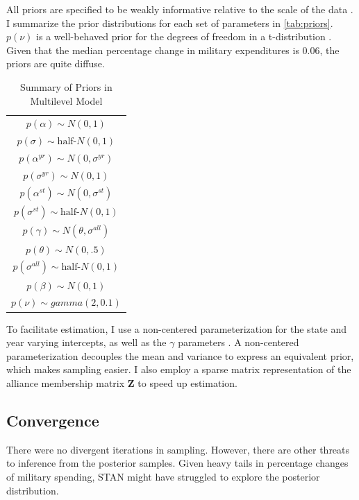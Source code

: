 \documentclass[12pt]{article}
\begin{document}
All priors are specified to be weakly informative relative to the scale of the data \citep{Gelmanetal2017}. 
I summarize the prior distributions for each set of parameters in \autoref{tab:priors}. 
$p(\nu)$ is a well-behaved prior for the degrees of freedom in a t-distribution \citep{JuarezSteele2010}. 
Given that the median percentage change in military expenditures is 0.06, the priors are quite diffuse. 


\begin{table} %
\begin{center}
\begin{tabular}{c} 
$ p(\alpha) \sim N(0, 1)$  \\
$ p(\sigma) \sim \mbox{half-}N(0, 1) $ \\
$ p(\alpha^{yr}) \sim N(0, \sigma^{yr}) $ \\ 
$ p(\sigma^{yr}) \sim N(0, 1) $ \\
$ p(\alpha^{st}) \sim N(0, \sigma^{st}) $ \\ 
$ p(\sigma^{st}) \sim \mbox{half-}N(0, 1) $ \\ 
$ p(\gamma) \sim N(\theta, \sigma^{all}) $ \\ 
$ p(\theta) \sim N(0, .5) $ \\
$ p(\sigma^{all}) \sim \mbox{half-}N(0, 1) $ \\
$ p(\beta) \sim N(0, 1) $ \\
$ p(\nu) \sim gamma(2, 0.1)$ 
\end{tabular} 
\caption{Summary of Priors in Multilevel Model} 
\label{tab:priors}
\end{center} 
\end{table} 


To facilitate estimation, I use a non-centered parameterization for the state and year varying intercepts, as well as the $\gamma$ parameters \citep{BetancourtGirolani2015}. 
A non-centered parameterization decouples the mean and variance to express an equivalent prior, which makes sampling easier. 
I also employ a sparse matrix representation of the alliance membership matrix $\textbf{Z}$ to speed up estimation. 


\subsection{Convergence} 


There were no divergent iterations in sampling. 
However, there are other threats to inference from the posterior samples. 
Given heavy tails in percentage changes of military spending, STAN might have struggled to explore the posterior distribution. 
\end{document}
